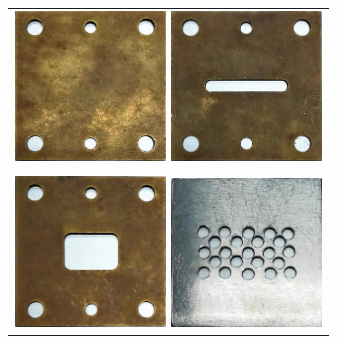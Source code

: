   \begin{figure}[htpb]
    \centering

  \begin{tabular}{c}
    \begin{minipage}{0.50\hsize}
    \centering
    \includegraphics[keepaspectratio, width=4cm]{./data/1.png}
    \caption{}
    \end{minipage}

    \begin{minipage}{0.50\hsize}
    \centering
    \includegraphics[keepaspectratio, width=4cm]{./data/2.png}
    \caption{}
    \end{minipage}

    \\
    \\
    \begin{minipage}{0.50\hsize}
    \centering
    \includegraphics[keepaspectratio, width=4cm]{./data/3.png}
    \caption{}
    \end{minipage}

    \begin{minipage}{0.50\hsize}
    \centering
    \includegraphics[keepaspectratio, width=4cm]{./data/4.png}
    \caption{}
    \end{minipage}


\end{tabular}
\end{figure}
